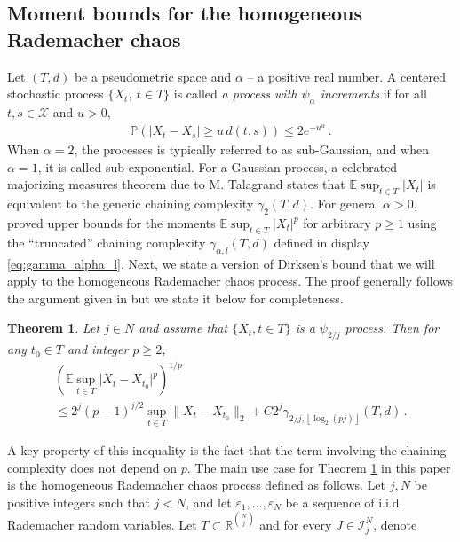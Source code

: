 \documentclass[12pt]{article}
\def\l{\left}
\def\r{\right}
\newcommand{\mb}{\mathbb}
\newtheorem{theorem}{Theorem}%
\theoremstyle{thmstyletwo}%
\theoremstyle{thmstylethree}%
\begin{document}
\subsection{Moment bounds for the homogeneous Rademacher chaos}
\label{sec:hypercontractive}

Let $(T,d)$ be a pseudometric space and $\alpha$ -- a positive real number. A centered stochastic process $\{X_t, \ t\in T\}$ is called \emph{a process with $\psi_\alpha$ increments} if for all $t, s \in \mathcal{X}$ and $u>0$,
\begin{align}\label{eq:tail_prob}
    \mb P\l(\l|X_{t} - X_{s}\r| \geq u\,d(t, s) \r) \leq 2e^{-u^{\alpha}}\,.
\end{align}
When  $\alpha = 2$, the processes is typically referred to as sub-Gaussian, and when $\alpha = 1$, it is called sub-exponential. For a Gaussian process, a celebrated majorizing measures theorem due to M. Talagrand states that $\mb E \sup_{t \in T} \lvert X_t \rvert$ is equivalent to the generic chaining complexity $\gamma_2(T,d)$. For general $\alpha>0$, \citet{dirksen2015tail} proved upper bounds for the moments $\mb E \sup_{t\in T} \lvert X_t \rvert^p$ for arbitrary $p \geq 1$  using the ``truncated'' chaining complexity $\gamma_{\alpha, l}(T, d)$ defined in display \eqref{eq:gamma_alpha_l}.  
Next, we state a version of Dirksen's bound that we will apply to the homogeneous Rademacher chaos process. The proof generally follows the argument given in \citep{dirksen2015tail} but we state it below for completeness.
\begin{theorem}
\label{thm:generic_bound}
    Let $j\in N$ and assume that $\{X_t, t \in T\}$ is a $\psi_{2/j}$ process. Then for any $t_0 \in T$ and integer $p \geq 2$, \begin{multline}
    \label{eq:general_bound_after_bonami}
        \l(\mb E \sup_{t \in T} \lvert X_t - X_{t_0} \rvert^p \r)^{1/p} \\
        \leq  2^{j}(p-1)^{j/2} \sup_{t \in T}\|X_t - X_{t_0}\|_2+C2^{j}\gamma_{2/j, \l\lfloor \log_2 (pj) \r\rfloor}(T, d)
         \,. 
    \end{multline}
\end{theorem}
A key property of this inequality is the fact that the term involving the chaining complexity does not depend on $p$. 
The main use case for Theorem \ref{thm:generic_bound} in this paper is the  homogeneous Rademacher chaos process defined as follows. Let $j, N$ be positive integers such that $j < N$, and let $\varepsilon_1,\ldots,\varepsilon_N$ be a sequence of i.i.d. Rademacher random variables. Let $T\subset \mb R^{N \choose j}$ and for every $J \in \mathcal{I}^N_j$, denote 
\end{document}
